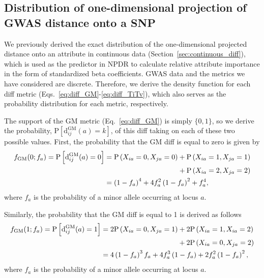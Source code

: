 \documentclass[10pt,letterpaper]{article}
\begin{document}
\subsection*{Distribution of one-dimensional projection of GWAS distance onto a SNP}\label{sec:GWAS_diff}

We previously derived the exact distribution of the one-dimensional projected distance onto an attribute in continuous data (Section~\ref{sec:continuous_diff}), which is used as the predictor in NPDR to calculate relative attribute importance in the form of standardized beta coefficients. GWAS data and the metrics we have considered are discrete. Therefore, we derive the density function for each diff metric (Eqs.~\ref{eq:diff_GM}-\ref{eq:diff_TiTv}), which also serves as the probability distribution for each metric, respectively.

The support of the GM metric (Eq.~\ref{eq:diff_GM}) is simply $\{0,1\}$, so we derive the probability, $\text{P}\left[\text{d}^\text{GM}_{ij}(a) = k\right]$, of this diff taking on each of these two possible values. First, the probability that the GM diff is equal to zero is given by
%
\begin{equation}\label{eq:probGM0}
\begin{aligned}
f_\text{GM}(0;f_a) = \text{P}\left[\text{d}^\text{GM}_{ij}(a) = 0\right] &= \text{P}\left(X_{ia}=0,X_{ja}=0\right) + \text{P}\left(X_{ia}=1,X_{ja}=1\right) \\
& \hspace{3.64cm} + \text{P}\left(X_{ia}=2,X_{ja}=2\right) \\
&= \left(1 - f_a\right)^4 + 4 f^2_a \left(1 - f_a\right)^2 + f^4_a,
\end{aligned}
\end{equation}
%
where $f_a$ is the probability of a minor allele occurring at locus $a$.

Similarly, the probability that the GM diff is equal to 1 is derived as follows
%
\begin{equation}\label{eq:probGM1}
\begin{aligned}
f_\text{GM}(1;f_a) = \text{P}\left[\text{d}^\text{GM}_{ij}(a) = 1\right] &= 2\text{P}\left(X_{ia}=0,X_{ja}=1\right) + 2\text{P}\left(X_{ia}=1,X_{ia}=2\right) \\
& \hspace{3.81cm} + 2\text{P}\left(X_{ia}=0,X_{ja}=2\right) \\
&= 4\left(1 - f_a\right)^3 f_a + 4 f^3_a \left(1 - f_a\right) + 2 f^2_a \left(1 - f_a\right)^2,
\end{aligned}
\end{equation}
%
where $f_a$ is the probability of a minor allele occurring at locus $a$.
\end{document}
